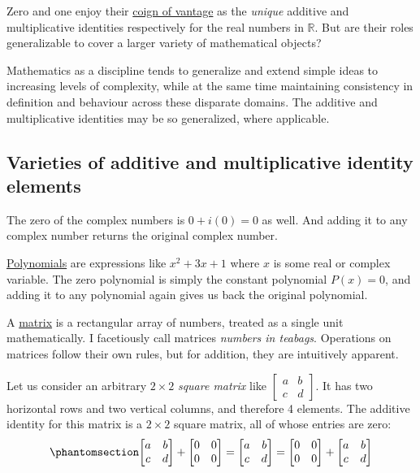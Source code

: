 \documentclass[
  a4paper,
]{article}
\begin{document}
Zero and one enjoy their
\href{https://dictionary.cambridge.org/dictionary/english/coign-of-vantage}{coign
of vantage} as the \emph{unique} additive and multiplicative identities
respectively for the real numbers in \(\mathbb{R}\). But are their roles
generalizable to cover a larger variety of mathematical objects?

Mathematics as a discipline tends to generalize and extend simple ideas
to increasing levels of complexity, while at the same time maintaining
consistency in definition and behaviour across these disparate domains.
The additive and multiplicative identities may be so generalized, where
applicable.

\subsection{Varieties of additive and multiplicative identity
elements}\label{varieties-of-additive-and-multiplicative-identity-elements}

The zero of the complex numbers is \(0 + i(0) = 0\) as well. And adding
it to any complex number returns the original complex number.

\href{https://mathworld.wolfram.com/Polynomial.html}{Polynomials} are
expressions like \(x^2 + 3x + 1\) where \(x\) is some real or complex
variable. The zero polynomial is simply the constant polynomial
\(P(x) = 0\), and adding it to any polynomial again gives us back the
original polynomial.

A \href{https://mathworld.wolfram.com/Matrix.html}{matrix} is a
rectangular array of numbers, treated as a single unit mathematically. I
facetiously call matrices \emph{numbers in teabags}. Operations on
matrices follow their own rules, but for addition, they are intuitively
apparent.

Let us consider an arbitrary \(2 \times 2\) \emph{square matrix} like
\(\begin{bmatrix}a & b\\c & d\end{bmatrix}\). It has two horizontal rows
and two vertical columns, and therefore 4 elements. The additive
identity for this matrix is a \(2 \times 2\) square matrix, all of whose
entries are zero: \begin{equation}\phantomsection\label{eq:addidmatrix}{
\begin{bmatrix}
a & b\\
c & d
\end{bmatrix}
+
\begin{bmatrix}
0 & 0\\
0 & 0
\end{bmatrix}
=
\begin{bmatrix}
a & b\\
c & d
\end{bmatrix}
=
\begin{bmatrix}
0 & 0\\
0 & 0
\end{bmatrix}
+
\begin{bmatrix}
a & b\\
c & d
\end{bmatrix}
}\end{equation}
\end{document}

